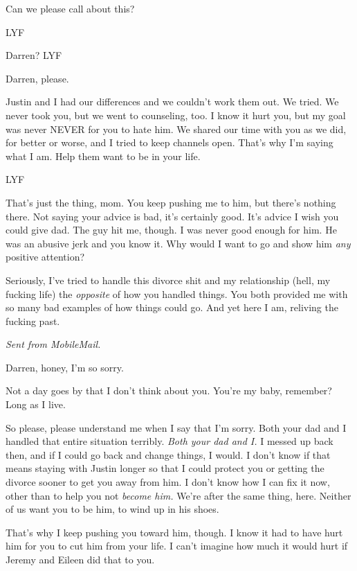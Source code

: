 Can we please call about this?

LYF

\secdiv{}

Darren? LYF

\secdiv{}

Darren, please.

Justin and I had our differences and we couldn't work them out. We tried. We never took you, but we went to counseling, too. I know it hurt you, but my goal was never NEVER for you to hate him. We shared our time with you as we did, for better or worse, and I tried to keep channels open. That's why I'm saying what I am. Help them want to be in your life.

LYF

\secdiv{}

That's just the thing, mom. You keep pushing me to him, but there's nothing there. Not saying your advice is bad, it's certainly good. It's advice I wish you could give dad. The guy hit me, though. I was never good enough for him. He was an abusive jerk and you know it. Why would I want to go and show him \emph{any} positive attention?

Seriously, I've tried to handle this divorce shit and my relationship (hell, my fucking life) the \emph{opposite} of how you handled things. You both provided me with so many bad examples of how things could go. And yet here I am, reliving the fucking past.

\emph{Sent from MobileMail.}

\secdiv{}

Darren, honey, I'm so sorry.

Not a day goes by that I don't think about you. You're my baby, remember? Long as I live.

So please, please understand me when I say that I'm sorry. Both your dad and I handled that entire situation terribly. \emph{Both your dad and I.} I messed up back then, and if I could go back and change things, I would. I don't know if that means staying with Justin longer so that I could protect you or getting the divorce sooner to get you away from him. I don't know how I can fix it now, other than to help you not \emph{become him.} We're after the same thing, here. Neither of us want you to be him, to wind up in his shoes.

That's why I keep pushing you toward him, though. I know it had to have hurt him for you to cut him from your life. I can't imagine how much it would hurt if Jeremy and Eileen did that to you.

